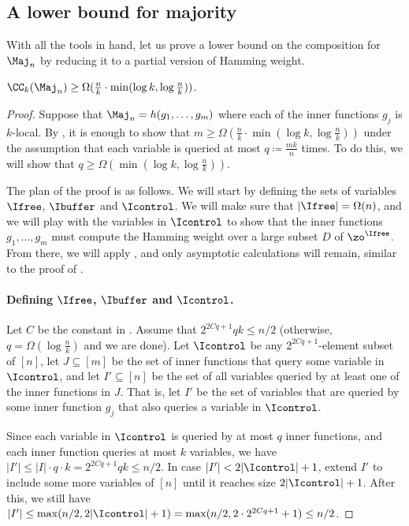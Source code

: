 \subsection{A lower bound for majority}
With all the tools in hand, let us prove a lower bound on the composition for $\Maj_n$ by reducing it to a partial version of Hamming weight.
\begin{theorem}
$\CC_k(\Maj_n) \geq \Omega(\frac{n}{k} \cdot \min(\log k, \log \frac{n}{k}))$.
\end{theorem}
\begin{proof}
Suppose that $\Maj_n = h(g_1, \ldots, g_m)$ where each of the inner functions $g_j$ is $k$-local.
By , it is enough to show that $m \geq \Omega(\frac{n}{k} \cdot \min(\log k, \log \frac{n}{k}))$ under the assumption that each variable is queried at most $q \coloneqq \frac{mk}{n}$ times.
To do this, we will show that $q \geq \Omega(\min(\log k, \log \frac{n}{k}))$.

The plan of the proof is as follows.
We will start by defining the sets of variables $\Ifree$, $\Ibuffer$ and $\Icontrol$.
We will make sure that $|\Ifree| = \Omega(n)$, and we will play with the variables in $\Icontrol$ to show that the inner functions $g_1, \ldots, g_m$ must compute the Hamming weight over a large subset $D$ of $\zo^{\Ifree}$.
From there, we will apply , and only asymptotic calculations will remain, similar to the proof of .

\paragraph*{Defining $\Ifree$, $\Ibuffer$ and $\Icontrol$.}
Let $C$ be the constant in .
Assume that $2^{2Cq+1} qk \leq n/2$ (otherwise, $q = \Omega(\log \frac{n}{k})$ and we are done).
Let $\Icontrol$ be any $2^{2Cq+1}$-element subset of $[n]$, let $J \subseteq [m]$ be the set of inner functions that query some variable in $\Icontrol$, and let $I'\subseteq [n]$ be the set of all variables queried by at least one of the inner functions in $J$.
That is, let $I'$ be the set of variables that are queried by some inner function $g_j$ that also queries a variable in $\Icontrol$.

Since each variable in $\Icontrol$ is queried by at most $q$ inner functions, and each inner function queries at most $k$ variables, we have $|I'| \leq |I| \cdot q \cdot k = 2^{2Cq+1} qk \leq n/2$.
In case $|I'| < 2|\Icontrol|+1$, extend $I'$ to include some more variables of $[n]$ until it reaches size $2|\Icontrol|+1$.
After this, we still have $|I'| \leq \max(n/2, 2|\Icontrol|+1) = \max(n/2, 2\cdot 2^{2Cq+1}+1) \leq n/2$.


\end{proof}
